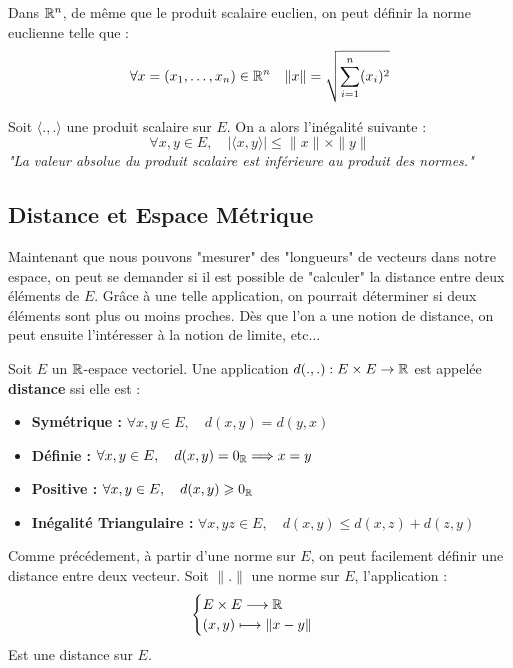 \begin{example}
    Dans $\mathbb{R}^n$, de même que le produit scalaire euclien, on peut définir la norme euclienne telle que :
    \[ 
        \forall x = (x_1, \dots, x_n) \in \mathbb{R}^n \quad \|x\| = \sqrt{ \sum_{i=1}^n (x_i)^2 }
    \] 
\end{example}

\begin{prop}
    Soit $\langle .,. \rangle$ une produit scalaire sur $E$. On a alors l'inégalité suivante :
        \[ \boxed{ \forall x, y \in E, \quad | \langle x, y \rangle | \leqslant \| x\| \times \|y\| } \] 
    \emph{"La valeur absolue du produit scalaire est inférieure au produit des normes."}
\end{prop}


\subsection{Distance et Espace Métrique}

Maintenant que nous pouvons "mesurer" des "longueurs" de vecteurs dans notre espace, on peut se demander si il est possible 
de "calculer" la distance entre deux éléments de $E$. Grâce à une telle application, on pourrait déterminer si deux éléments sont 
plus ou moins proches. Dès que l'on a une notion de distance, on peut ensuite l'intéresser à la notion de limite, etc... 

\begin{definition}[Distance]
    Soit $E$ un $\mathbb{R}$-espace vectoriel. 
    Une application $d(.,.) : E \times E \rightarrow \mathbb{R}$ est appelée \textbf{distance} ssi elle est :
    \begin{itemize}
        \item \textbf{Symétrique : } $ \forall x,y \in E, \quad d(x,y) = d(y,x) $
        \item \textbf{Définie : } $ \forall x,y \in E, \quad d(x,y) = 0_{\mathbb{R}} \Longrightarrow x = y $
        \item \textbf{Positive : } $ \forall x,y \in E, \quad d(x,y) \geqslant 0_{\mathbb{R}} $
        \item \textbf{Inégalité Triangulaire : } $ \forall x,yz \in E, \quad d(x,y) \leqslant d(x,z) + d(z,y)$ 
    \end{itemize}
\end{definition}

\begin{proposition}
    Comme précédement, à partir d'une norme sur $E$, on peut facilement définir une distance entre deux vecteur. 
    Soit $\|.\|$ une norme sur $E$, l'application :
        \[ 
            \begin{cases}
                E \times E \longrightarrow \mathbb{R} \\ 
                (x,y) \longmapsto \| x - y \| 
            \end{cases}
        \] 
    Est une distance sur $E$. 
\end{proposition}

